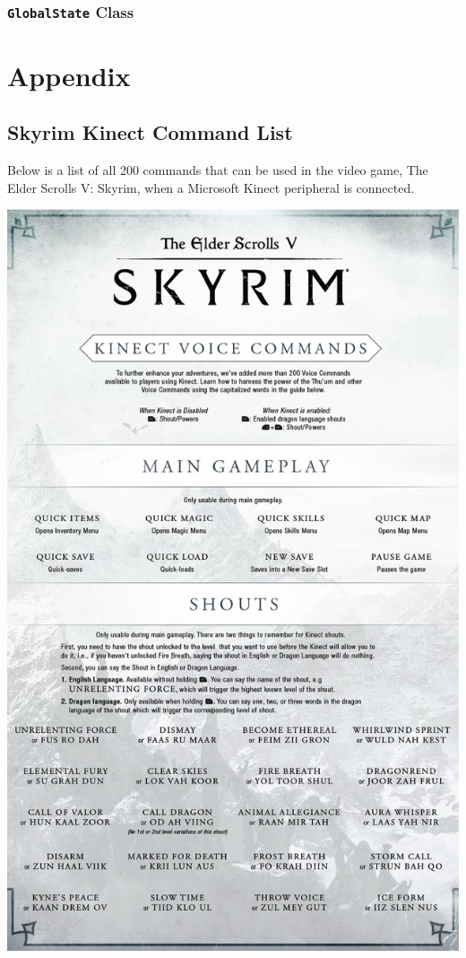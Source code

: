 \documentclass[12pt]{article}
\begin{document}
\subsubsection{\texttt{GlobalState} Class}

\newpage
\section{Appendix}
\subsection{Skyrim Kinect Command List}
Below is a list of all 200 commands that can be used in the video game, The Elder Scrolls V: Skyrim, when a Microsoft Kinect peripheral is connected.

\includegraphics[scale=0.235]{skyrim-1.jpg}
\end{document}
